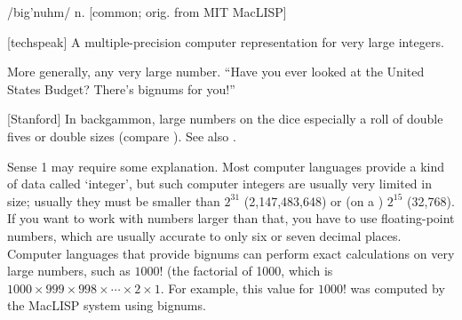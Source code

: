  /big'nuhm/ n.
[common; orig. from MIT MacLISP]
\begin{inparaenum}
	\item {[}techspeak] A multiple-precision computer representation for very
          large integers.
	\item More generally, any very large number. ``Have you ever looked at the
          United States Budget? There's bignums for you!''
	\item {[}Stanford] In backgammon, large numbers on the dice especially a
          roll of double fives or double sizes (compare ).
          See also .
\end{inparaenum}

Sense 1 may require some explanation. Most computer languages provide a kind of
data called `integer', but such computer integers are usually very limited in
size; usually they must be smaller than $2^{31}$ (2,147,483,648) or (on a
) $2^{15}$ (32,768). If you want to work with numbers
larger than that, you have to use floating-point numbers, which are usually
accurate to only six or seven decimal places. Computer languages that provide
bignums can perform exact calculations on very large numbers, such as $1000!$
(the factorial of 1000, which is
$1000\times999\times998\times\cdots\times2\times1$. For example, this value for
$1000!$ was computed by the MacLISP system using bignums.

